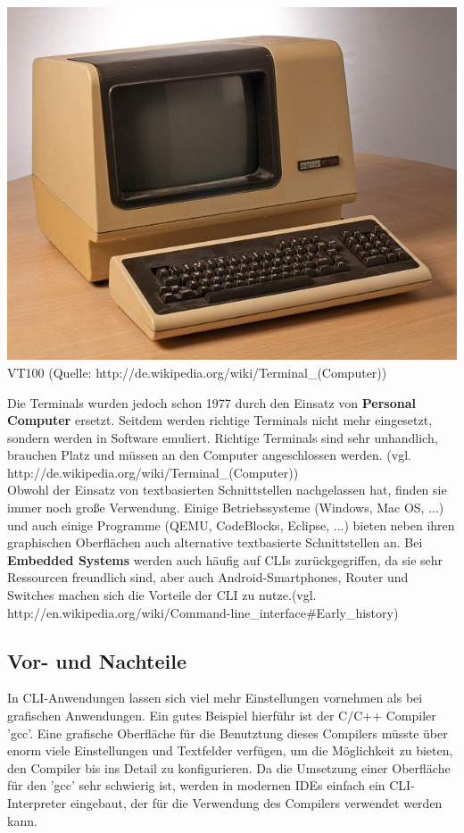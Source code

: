 \documentclass[12pt,a4paper]{report}
\begin{document}
\begin{onehalfspace}
\begin{center}
\includegraphics[scale=2.0]{img/vt100.jpg}\\
VT100 (Quelle: http://de.wikipedia.org/wiki/Terminal\_(Computer))
\end{center}

Die Terminals wurden jedoch schon 1977 durch den Einsatz von \textbf{Personal Computer} ersetzt. Seitdem werden richtige Terminals nicht mehr eingesetzt, sondern werden in Software emuliert. Richtige Terminals sind sehr unhandlich, brauchen Platz und müssen an den Computer angeschlossen werden. (vgl. http://de.wikipedia.org/wiki/Terminal\_(Computer))\\

Obwohl der Einsatz von textbasierten Schnittstellen nachgelassen hat, finden sie immer noch große Verwendung. Einige Betriebssysteme (Windows, Mac OS, ...) und auch einige Programme (QEMU, CodeBlocks, Eclipse, ...) bieten neben ihren graphischen Oberflächen auch alternative textbasierte Schnittstellen an. Bei \textbf{Embedded Systems} werden auch häufig auf CLIs zurückgegriffen, da sie sehr Ressourcen freundlich sind, aber auch Android-Smartphones, Router und Switches machen sich die Vorteile der CLI zu nutze.(vgl. http://en.wikipedia.org/wiki/Command-line\_interface\#Early\_history)

\subsection{Vor- und Nachteile}

In CLI-Anwendungen lassen sich viel mehr Einstellungen vornehmen als bei grafischen Anwendungen. Ein gutes Beispiel hierführ ist der C/C++ Compiler 'gcc'. Eine grafische Oberfläche für die Benutztung dieses Compilers müsste über enorm viele Einstellungen und Textfelder verfügen, um die Möglichkeit zu bieten, den Compiler bis ins Detail zu konfigurieren. Da die Umsetzung einer Oberfläche für den 'gcc' sehr schwierig ist, werden in modernen IDEs einfach ein CLI-Interpreter eingebaut, der für die Verwendung des Compilers verwendet werden kann.\\


\end{onehalfspace}
\end{document}
